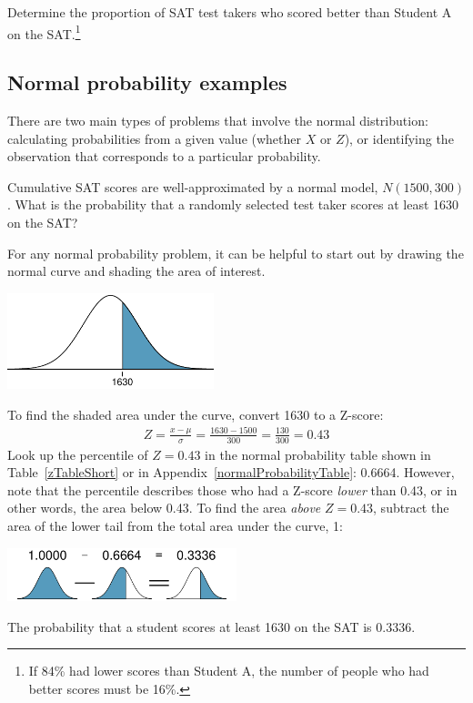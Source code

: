 \begin{exercise}
Determine the proportion of SAT test takers who scored better than Student A on the SAT.\footnote{If 84\% had lower scores than Student A, the number of people who had better scores must be 16\%.}
\end{exercise}

\subsection{Normal probability examples}

There are two main types of problems that involve the normal distribution: calculating probabilities from a given value (whether $X$ or $Z$), or identifying the observation that corresponds to a particular probability. 

\begin{example}{Cumulative SAT scores are well-approximated by a normal model, $N(1500, 300)$. What is the probability that a randomly selected test taker scores at least 1630 on the SAT?}\label{satAbove1630Exam}
	
For any normal probability problem, it can be helpful to start out by drawing the normal curve and shading the area of interest.

\begin{center}
\includegraphics[width=0.45\textwidth]{ch_distributions_oi_biostat/figures/satAbove1630/satAbove1630}
\end{center}
To find the shaded area under the curve, convert 1630 to a Z-score:
\begin{align*}
Z = \frac{x - \mu}{\sigma} = \frac{1630 - 1500}{300} = \frac{130}{300} = 0.43
\end{align*}
Look up the percentile of $Z=0.43$ in the normal probability table shown in Table~\ref{zTableShort} or in Appendix~\vref{normalProbabilityTable}: 0.6664. However, note that the percentile describes those who had a Z-score \emph{lower} than 0.43, or in other words, the area below 0.43. To find the area \emph{above} $Z=0.43$, subtract the area of the lower tail from the total area under the curve, 1:
\begin{center}
\includegraphics[width=0.5\textwidth]{ch_distributions_oi_biostat/figures/subtractingArea/subtractingArea}
\end{center}
The probability that a student scores at least 1630 on the SAT is 0.3336.
\end{example}

